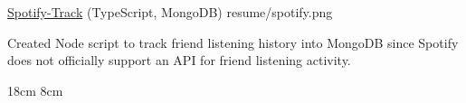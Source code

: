 \begin{cventries}
  \portfolioEntry
    {\href{https://github.com/danielq987/spotify-track}{Spotify-Track} (TypeScript, MongoDB)} %
    {resume/spotify.png} %
    {
      \begin{cvitems} %
        \item {Created Node script to track friend listening history into MongoDB since Spotify does not officially support an API for friend listening activity.}
      \end{cvitems}
    }
    {18cm}
    {8cm}

\end{cventries}
